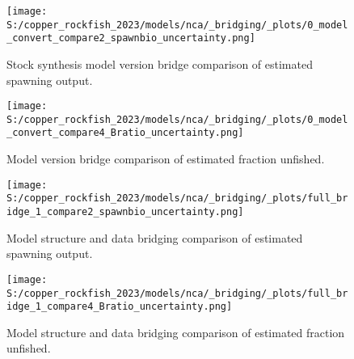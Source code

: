 \documentclass[11pt,
  letterpaper,
]{article}
\begin{document}
\begin{figure}
{\centering
\texttt{[image: S:/copper\_rockfish\_2023/models/nca/\_bridging/\_plots/0\_model\_convert\_compare2\_spawnbio\_uncertainty.png]}
}
\caption{Stock synthesis model version bridge comparison of estimated spawning output.\label{fig:bridge-ssb}}
\end{figure}

\pagebreak

\begin{figure}
{\centering
\texttt{[image: S:/copper\_rockfish\_2023/models/nca/\_bridging/\_plots/0\_model\_convert\_compare4\_Bratio\_uncertainty.png]}
}
\caption{Model version bridge comparison of estimated fraction unfished.\label{fig:bridge-depl}}
\end{figure}

\pagebreak

\begin{figure}
{\centering
\texttt{[image: S:/copper\_rockfish\_2023/models/nca/\_bridging/\_plots/full\_bridge\_1\_compare2\_spawnbio\_uncertainty.png]}
}
\caption{Model structure and data bridging comparison of estimated spawning output.\label{fig:data-bridge-ssb-1}}
\end{figure}

\pagebreak

\begin{figure}
{\centering
\texttt{[image: S:/copper\_rockfish\_2023/models/nca/\_bridging/\_plots/full\_bridge\_1\_compare4\_Bratio\_uncertainty.png]}
}
\caption{Model structure and data bridging comparison of estimated fraction unfished.\label{fig:data-bridge-depl-1}}
\end{figure}
\end{document}
